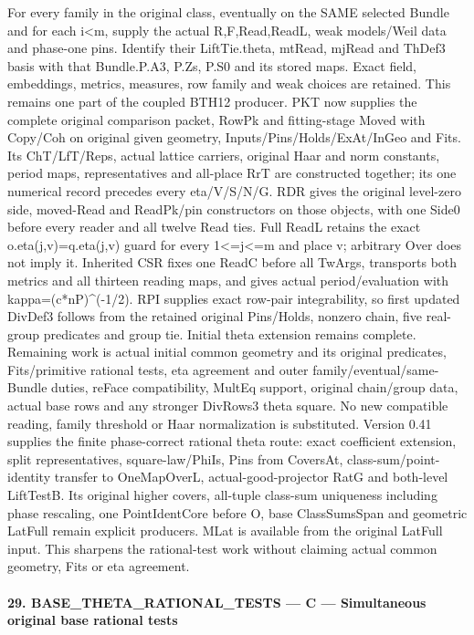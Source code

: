 For every family in the original class, eventually on the SAME selected Bundle and for each i<m, supply the actual R,F,Read,ReadL, weak models/Weil data and phase-one pins. Identify their LiftTie.theta, mtRead, mjRead and ThDef3 basis with that Bundle.P.A3, P.Zs, P.S0 and its stored maps. Exact field, embeddings, metrics, measures, row family and weak choices are retained. This remains one part of the coupled BTH12 producer. PKT now supplies the complete original comparison packet, RowPk and fitting-stage Moved with Copy/Coh on original given geometry, Inputs/Pins/Holds/ExAt/InGeo and Fits. Its ChT/LfT/Reps, actual lattice carriers, original Haar and norm constants, period maps, representatives and all-place RrT are constructed together; its one numerical record precedes every eta/V/S/N/G. RDR gives the original level-zero side, moved-Read and ReadPk/pin constructors on those objects, with one Side0 before every reader and all twelve Read ties. Full ReadL retains the exact o.eta(j,v)=q.eta(j,v) guard for every 1<=j<=m and place v; arbitrary Over does not imply it. Inherited CSR fixes one ReadC before all TwArgs, transports both metrics and all thirteen reading maps, and gives actual period/evaluation with kappa=(c*nP)\textasciicircum{}(-1/2). RPI supplies exact row-pair integrability, so first updated DivDef3 follows from the retained original Pins/Holds, nonzero chain, five real-group predicates and group tie. Initial theta extension remains complete. Remaining work is actual initial common geometry and its original predicates, Fits/primitive rational tests, eta agreement and outer family/eventual/same-Bundle duties, reFace compatibility, MultEq support, original chain/group data, actual base rows and any stronger DivRows3 theta square. No new compatible reading, family threshold or Haar normalization is substituted. Version 0.41 supplies the finite phase-correct rational theta route: exact coefficient extension, split representatives, square-law/PhiIs, Pins from CoversAt, class-sum/point-identity transfer to OneMapOverL, actual-good-projector RatG and both-level LiftTestB. Its original higher covers, all-tuple class-sum uniqueness including phase rescaling, one PointIdentCore before O, base ClassSumsSpan and geometric LatFull remain explicit producers. MLat is available from the original LatFull input. This sharpens the rational-test work without claiming actual common geometry, Fits or eta agreement.



\paragraph{29. BASE\_\allowbreak THETA\_\allowbreak RATIONAL\_\allowbreak TESTS — C — Simultaneous original base rational tests}

